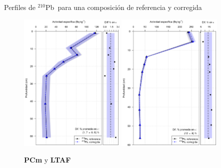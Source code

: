 \documentclass[9pt]{beamer}
\newcommand{\PbCero}{$^{210}$Pb}
\begin{document}
\begin{frame}{Perfiles de \PbCero\, para una composición de referencia y corregida}
	\begin{figure}
		\centering
		\includegraphics[width=0.45\textwidth]{Imagenes/Act_210Pb_Agua_Composicion_PCm.png}
		\includegraphics[width=0.45\textwidth]{Imagenes/Act_210Pb_Agua_Composicion_LTAF.png}
		\caption{ \textbf{PCm} y \textbf{LTAF} }
		\end{figure}
\end{frame}
\end{document}
